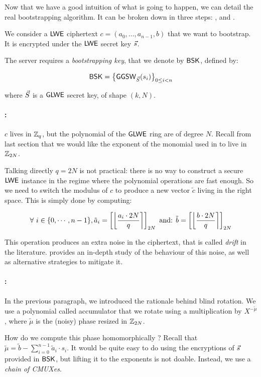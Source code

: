 Now that we have a good intuition of what is going to happen, we can detail the real bootstrapping algorithm. It can be broken down in three steps: \ModSwitch, \BlindRotate and \SampleExtract.

We consider a $\textsf{LWE}$ ciphertext $c = (a_0, \dots, a_{n-1}, b)$ that we want to bootstrap. It is encrypted under the $\textsf{LWE}$ secret key $\vec s$. 

The server requires a \textit{bootstrapping key}, that we denote by $\textsf{BSK}$, defined by:

\[
	\textsf{BSK} = \left \lbrace \textsf{GGSW}_{\vec S}(s_i) \right \rbrace_{0 \le i < n}
\]

where $\vec S$ is a $\textsf{GLWE}$ secret key, of shape $(k, N)$.


\paragraph{\ModSwitch:}

$c$ lives in $\mathbb{Z}_q$, but the polynomial of the $\textsf{GLWE}$ ring are of degree $N$. Recall from last section that we would like the exponent of the monomial used in \BlindRotate to live in $\mathbb{Z}_{2N}$.

Talking directly $q = 2N$ is not practical: there is no way to construct a secure $\textsf{LWE}$ instance in the regime where the polynomial operations are fast enough. So we need to switch the modulus of $c$ to produce a new vector $\tilde c$ living in the right space. This is simply done by computing:

\[
	\forall~i \in \{0, \cdots, n-1\}, \tilde a_i = \left [ \left \lfloor \frac{a_i \cdot 2N}{q} \right \rceil \right ]_{2N} \text{ and: } \tilde b = \left [ \left \lfloor \frac{b \cdot 2N}{q} \right \rceil \right ]_{2N}
\]


This operation produces an extra noise in the ciphertext, that is called \textit{drift} in the literature. \cite{EC:BJSW24} provides an in-depth study of the behaviour of this noise, as well as alternative strategies to mitigate it.


\paragraph{\BlindRotate:}

In the previous paragraph, we introduced the rationale behind blind rotation. We use a polynomial called accumulator that we rotate using a multiplication by $X^{-\tilde \mu}$, where $\tilde \mu$ is the (noisy) phase resized in $\mathbb{Z}_{2N}$.

How do we compute this phase homomorphically ? Recall that $\tilde \mu = \tilde b - \sum_{i=0}^{n-1} \tilde a_i \cdot s_i$. It would be quite easy to do using the encryptions of $\vec s$ provided in $\textsf{BSK}$, but lifting it to the exponents is not doable. Instead, we use a \textit{chain of CMUXes}.

